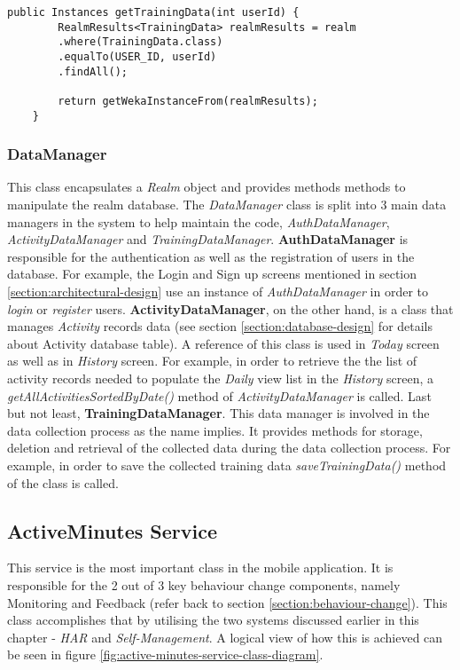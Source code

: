      \begin{lstlisting}[caption= Accessing database tables, label=accessing_database_tables,
     frame=tlrbr,basicstyle=\small,captionpos=b]
   public Instances getTrainingData(int userId) {
        RealmResults<TrainingData> realmResults = realm
        .where(TrainingData.class)
        .equalTo(USER_ID, userId)
        .findAll();
        
        return getWekaInstanceFrom(realmResults);
    }
    \end{lstlisting}
    
    \subsubsection{DataManager}
    This class encapsulates a \textit{Realm} object and provides methods methods to manipulate the realm database. The \textit{DataManager} class is split into 3 main data managers in the system to help maintain the code, \textit{AuthDataManager}, \textit{ActivityDataManager} and \textit{TrainingDataManager}. \textbf{AuthDataManager} is responsible for the authentication as well as the registration of users in the database. For example, the Login and Sign up screens mentioned in section \ref{section:architectural-design} use an instance of \textit{AuthDataManager} in order to \textit{login} or \textit{register} users. \textbf{ActivityDataManager}, on the other hand, is a class that manages \textit{Activity} records data (see section \ref{section:database-design} for details about Activity database table). A reference of this class is used in \textit{Today} screen as well as in \textit{History} screen. For example, in order to retrieve the the list of activity records needed to populate the \textit{Daily} view list in the \textit{History} screen, a \textit{getAllActivitiesSortedByDate()} method of \textit{ActivityDataManager} is called. Last but not least, \textbf{TrainingDataManager}. This data manager is involved in the data collection process as the name implies. It provides methods for storage, deletion and retrieval of the collected data during the data collection process. For example, in order to save the collected training data \textit{saveTrainingData()} method of the class is called.
    
    
    \subsection{ActiveMinutes Service}
    This service is the most important class in the mobile application. It is responsible for the 2 out of 3 key behaviour change components, namely Monitoring and Feedback (refer back to section \ref{section:behaviour-change}). This class accomplishes that by utilising the two systems discussed earlier in this chapter - \textit{HAR} and \textit{Self-Management}. A logical view of how this is achieved can be seen in figure \ref{fig:active-minutes-service-class-diagram}. 
    
